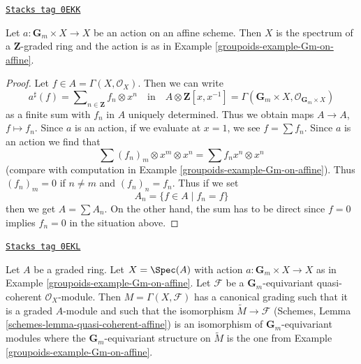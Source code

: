 \begin{lemma}
\label{groupoids-lemma-complete-reducibility-Gm}
\href{https://stacks.math.columbia.edu/tag/0EKK}{\texttt{Stacks tag 0EKK}}

Let $a : \mathbf{G}_m \times X \to X$ be an action on an affine scheme.
Then $X$ is the spectrum of a $\mathbf{Z}$-graded ring
and the action is as in Example \ref{groupoids-example-Gm-on-affine}.
\end{lemma}

\begin{proof}

Let $f \in A = \Gamma(X, \mathcal{O}_X)$. Then we can write
$$
a^\sharp(f) = \sum\nolimits_{n \in \mathbf{Z}} f_n \otimes x^n
\quad\text{in}\quad
A \otimes \mathbf{Z}[x, x^{-1}] =
\Gamma(\mathbf{G}_m \times X, \mathcal{O}_{\mathbf{G}_m \times X})
$$
as a finite sum with $f_n$ in $A$ uniquely determined.
Thus we obtain maps $A \to A$, $f \mapsto f_n$.
Since $a$ is an action, if we evaluate at $x = 1$,
we see $f = \sum f_n$. Since $a$ is an action
we find that
$$
\sum (f_n)_m \otimes x^m \otimes x^n = \sum f_n x^n \otimes x^n
$$
(compare with computation in Example \ref{groupoids-example-Gm-on-affine}).
Thus $(f_n)_m = 0$ if $n \not = m$ and $(f_n)_n = f_n$.
Thus if we set
$$
A_n = \{f \in A \mid f_n = f\}
$$
then we get $A = \sum A_n$. On the other hand, the sum has to be
direct since $f = 0$ implies $f_n = 0$ in the situation above.
\end{proof}

\begin{lemma}
\label{groupoids-lemma-Gm-equivariant-module}
\href{https://stacks.math.columbia.edu/tag/0EKL}{\texttt{Stacks tag 0EKL}}

Let $A$ be a graded ring. Let $X = \Spec(A)$ with action
$a : \mathbf{G}_m \times X \to X$ as in Example \ref{groupoids-example-Gm-on-affine}.
Let $\mathcal{F}$ be a $\mathbf{G}_m$-equivariant quasi-coherent
$\mathcal{O}_X$-module. Then $M = \Gamma(X, \mathcal{F})$
has a canonical grading such that it is a graded $A$-module
and such that the isomorphism $\widetilde{M} \to \mathcal{F}$
(Schemes, Lemma \ref{schemes-lemma-quasi-coherent-affine})
is an isomorphism of $\mathbf{G}_m$-equivariant modules where
the $\mathbf{G}_m$-equivariant structure on $\widetilde{M}$
is the one from Example \ref{groupoids-example-Gm-on-affine}.
\end{lemma}

